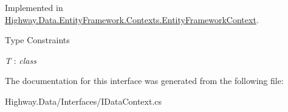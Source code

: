 Implemented in \hyperlink{class_highway_1_1_data_1_1_entity_framework_1_1_contexts_1_1_entity_framework_context_a3746422e9f70039d208c6dd6be02327e}{Highway.\-Data.\-Entity\-Framework.\-Contexts.\-Entity\-Framework\-Context}.

\begin{Desc}
\item[Type Constraints]\begin{description}
\item[{\em T} : {\em class}]\end{description}
\end{Desc}


The documentation for this interface was generated from the following file\-:\begin{DoxyCompactItemize}
\item 
Highway.\-Data/\-Interfaces/I\-Data\-Context.\-cs\end{DoxyCompactItemize}
